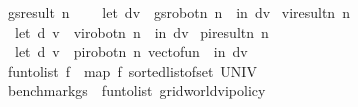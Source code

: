 \begin{isabellebody}
\isanewline
{}\isamarkupfalse%
\ {\isachardoublequoteopen}gs{\isacharunderscore}{\kern0pt}result\ n\ {\isacharequal}{\kern0pt}\ \isanewline
\ \ {\isacharparenleft}{\kern0pt}let\ {\isacharparenleft}{\kern0pt}d{\isacharcomma}{\kern0pt}v{\isacharparenright}{\kern0pt}\ {\isacharequal}{\kern0pt}\ gs{\isacharunderscore}{\kern0pt}robot{\isacharunderscore}{\kern0pt}n\ n\ {}\ in\ {\isacharparenleft}{\kern0pt}d{\isacharcomma}{\kern0pt}v{\isacharparenright}{\kern0pt}{\isacharparenright}{\kern0pt}{\isachardoublequoteclose}\isanewline
\isanewline
{}\isamarkupfalse%
\ {\isachardoublequoteopen}vi{\isacharunderscore}{\kern0pt}result{\isacharunderscore}{\kern0pt}n\ n\ {\isacharequal}{\kern0pt}\ \isanewline
\ \ {\isacharparenleft}{\kern0pt}let\ {\isacharparenleft}{\kern0pt}d{\isacharcomma}{\kern0pt}\ v{\isacharparenright}{\kern0pt}\ {\isacharequal}{\kern0pt}\ vi{\isacharunderscore}{\kern0pt}robot{\isacharunderscore}{\kern0pt}n\ n\ {}\ in\ {\isacharparenleft}{\kern0pt}d{\isacharcomma}{\kern0pt}v{\isacharparenright}{\kern0pt}{\isacharparenright}{\kern0pt}{\isachardoublequoteclose}\isanewline
\isanewline
{}\isamarkupfalse%
\ {\isachardoublequoteopen}pi{\isacharunderscore}{\kern0pt}result{\isacharunderscore}{\kern0pt}n\ n\ {\isacharequal}{\kern0pt}\ \isanewline
\ \ {\isacharparenleft}{\kern0pt}let\ {\isacharparenleft}{\kern0pt}d{\isacharcomma}{\kern0pt}\ v{\isacharparenright}{\kern0pt}\ {\isacharequal}{\kern0pt}\ pi{\isacharunderscore}{\kern0pt}robot{\isacharunderscore}{\kern0pt}n\ n\ {\isacharparenleft}{\kern0pt}vec{\isacharunderscore}{\kern0pt}to{\isacharunderscore}{\kern0pt}fun\ {}{\isacharparenright}{\kern0pt}\ in\ {\isacharparenleft}{\kern0pt}d{\isacharcomma}{\kern0pt}v{\isacharparenright}{\kern0pt}{\isacharparenright}{\kern0pt}{\isachardoublequoteclose}\isanewline
\isanewline
{}\isamarkupfalse%
\ {\isachardoublequoteopen}fun{\isacharunderscore}{\kern0pt}to{\isacharunderscore}{\kern0pt}list\ f\ {\isacharequal}{\kern0pt}\ map\ f\ {\isacharparenleft}{\kern0pt}sorted{\isacharunderscore}{\kern0pt}list{\isacharunderscore}{\kern0pt}of{\isacharunderscore}{\kern0pt}set\ UNIV{\isacharparenright}{\kern0pt}{\isachardoublequoteclose}\isanewline
\isanewline
{}\isamarkupfalse%
\ {\isachardoublequoteopen}benchmark{\isacharunderscore}{\kern0pt}gs\ {\isacharequal}{\kern0pt}\ fun{\isacharunderscore}{\kern0pt}to{\isacharunderscore}{\kern0pt}list\ {\isacharparenleft}{\kern0pt}gridworld{\isacharunderscore}{\kern0pt}vi{\isacharunderscore}{\kern0pt}policy{\isacharprime}{\kern0pt}\ {}{\isachardot}{\kern0pt}{}\ {}{\isacharparenright}{\kern0pt}{\isachardoublequoteclose}\isanewline

\end{isabellebody}
